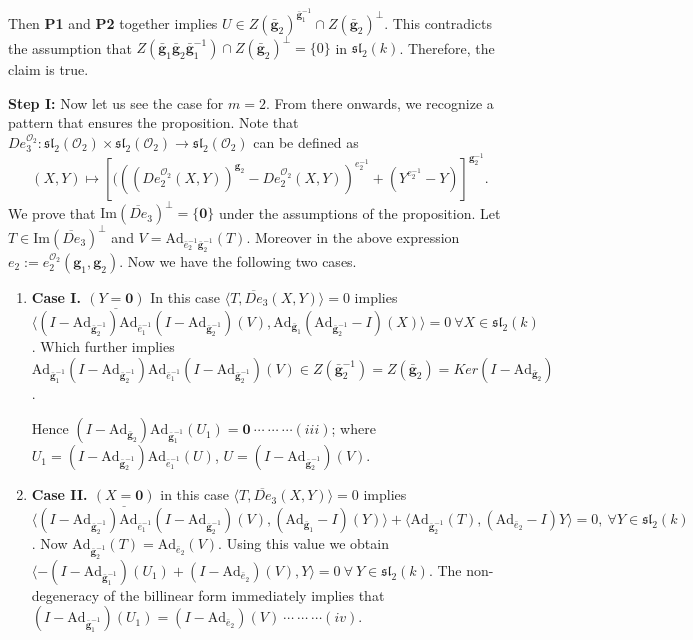 \documentclass[10pt,twoside]{amsart}
\newcommand{\im}{\mathrm{Im}}
\newcommand{\R}{\mathcal{O}_2}
\theoremstyle{definition}
\theoremstyle{definition}
\begin{document}
Then \textbf{P1} and \textbf{P2} together implies $U\in Z(\mathbf{\bar g}_2)^{\mathbf{\bar g}_1^{-1}}\cap Z(\mathbf{\bar g}_2)^{\perp} $. This contradicts the assumption that $Z(\mathbf{\bar g}_1\mathbf{\bar g}_2\mathbf{\bar g}_1^{-1})\cap Z(\mathbf{\bar g}_2)^{\perp}=\{0\}$ in $\mathfrak{sl}_2(k)$. Therefore, the claim is true.  
\vspace{10pt}



{\bf Step I:} Now let us see the case for $m=2$. From there onwards, we recognize a pattern that ensures the proposition. Note that ${De}^{\R}_3:\mathfrak{sl}_2(\mathcal{O}_2)\times\mathfrak{sl}_2(\mathcal{O}_2)\rightarrow\mathfrak{sl}_2(\mathcal{O}_2)$ can be defined as $$(X,Y)\mapsto [(((De_2^{\R}(X,Y))^{\mathbf{g}_2}-De_2^{\R}(X,Y))^{e_2^{-1}}+(Y^{e_2^{-1}}-Y)]^{\mathbf{g}_2^{-1}}.$$
    We prove that $\im(\overline{De}_3)^{\perp}=\{\mathbf{0}\}$ under the assumptions of the proposition. Let $T\in \im(\overline{De}_3)^{\perp} $ and $V=\mathrm{Ad}_{\bar e_2^{-1}\mathbf{\bar g}_2^{-1}}(T)$. Moreover in the above expression $e_2:=e_2^{\R}(\mathbf{g}_1,\mathbf{g}_2)$. Now we have the following two cases.

    \begin{enumerate}
    \item \textbf{Case I. $\underline {(Y=\mathbf{0})}$} In this case $\langle T, \overline{De}_3(X,Y)\rangle=0$ implies $\langle (I-\mathrm{Ad}_{\mathbf{\bar g}_2^{-1}})\mathrm{Ad}_{\bar e_1^{-1}}(I-\mathrm{Ad}_{\mathbf{\bar g}_2^{-1}})(V),\mathrm{Ad}_{\mathbf{\bar g}_1}(\mathrm{Ad}_{\mathbf{\bar g}_2^{-1}}-I)(X)\rangle=0 \ \forall X\in \mathfrak{sl}_2(k)$. Which further implies $\mathrm{Ad}_{\mathbf{\bar g}_1^{-1}}(I-\mathrm{Ad}_{\mathbf{\bar g}_2^{-1}})\mathrm{Ad}_{\bar e_1^{-1}}(I-\mathrm{Ad}_{\mathbf{\bar g}_2^{-1}})(V)\in Z(\mathbf{\bar g}_2^{-1})=Z(\mathbf{\bar g}_2)=Ker (I-\mathrm{Ad}_{\mathbf{\bar g}_2})$. 
    
    \noindent Hence $\boxed{(I-\mathrm{Ad}_{\mathbf{\bar g}_2})\mathrm{Ad}_{\mathbf{\bar g}_1^{-1}}(U_1)=\mathbf{0}}\ \cdots \ \cdots\  \cdots (iii)$; where $U_1=(I-\mathrm{Ad}_{\mathbf{\bar g}_2^{-1}})\mathrm{Ad}_{\bar e_1^{-1}}(U)$, $U=(I-\mathrm{Ad}_{\mathbf{\bar g}_2^{-1}})(V)$.  
        \item \textbf{Case II. $\underline {(X=\mathbf{0})}$} in  this case $\langle T,\overline{De}_3(X,Y)\rangle=0$ implies $\langle(I-\mathrm{Ad}_{\mathbf{\bar g}_2^{-1}})\mathrm{Ad}_{\bar e_1^{-1}}(I-\mathrm{Ad}_{\mathbf{\bar g}_2^{-1}})(V), (\mathrm{Ad}_{\mathbf{\bar g}_1}-I)(Y)\rangle+\langle \mathrm{Ad}_{\mathbf{\bar g}_2^{-1}}(T),(\mathrm{Ad}_{\bar e_2}-I)Y\rangle=0 ,\ \forall Y\in \mathfrak{sl}_2(k) $. Now $\mathrm{Ad}_{\mathbf{\bar g}_2^{-1}}(T)=\mathrm{Ad}_{\bar e_2}(V)$. Using this value we obtain $\langle -(I-\mathrm{Ad}_{\mathbf{\bar g}_1^{-1}})(U_1)+(I-\mathrm{Ad}_{\bar e_2})(V),Y\rangle=0\ \forall \   Y\in \mathfrak{sl}_2(k) $. The non-degeneracy of the billinear form immediately implies that $\boxed{(I-\mathrm{Ad}_{\mathbf{\bar g}_1^{-1}})(U_1)=(I-\mathrm{Ad}_{\bar e_2})(V)}\ \cdots \ \cdots\ \cdots (iv)$. 
    \end{enumerate}
\end{document}
